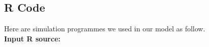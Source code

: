 \documentclass{mcmthesis}
\begin{document}
\begin{appendices}
\section{R Code}\label{R Code}

Here are simulation programmes we used in our model as follow.\\

\textcolor[rgb]{0.98,0.00,0.00}{\textbf{Input R source:}}


\end{appendices}
\end{document}
